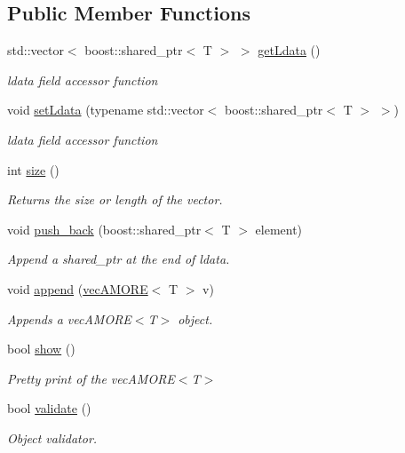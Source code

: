 \subsection*{Public Member Functions}
\begin{DoxyCompactItemize}
\item 
std::vector$<$ boost::shared\_\-ptr$<$ T $>$ $>$ \hyperlink{classvec_a_m_o_r_e_aeabf8a479f9031cc8ef9af0a971a08ea}{getLdata} ()
\begin{DoxyCompactList}\small\item\em ldata field accessor function \end{DoxyCompactList}\item 
void \hyperlink{classvec_a_m_o_r_e_ad1594c084d534c3de7acedd714f2e12a}{setLdata} (typename std::vector$<$ boost::shared\_\-ptr$<$ T $>$ $>$)
\begin{DoxyCompactList}\small\item\em ldata field accessor function \end{DoxyCompactList}\item 
int \hyperlink{classvec_a_m_o_r_e_ae1289a7870dbdd19b6455a890e94ce48}{size} ()
\begin{DoxyCompactList}\small\item\em Returns the size or length of the vector. \end{DoxyCompactList}\item 
void \hyperlink{classvec_a_m_o_r_e_a7b02ec757039b4d8fa98c3682002f156}{push\_\-back} (boost::shared\_\-ptr$<$ T $>$ element)
\begin{DoxyCompactList}\small\item\em Append a shared\_\-ptr at the end of ldata. \end{DoxyCompactList}\item 
void \hyperlink{classvec_a_m_o_r_e_ab060ffa67e85997fc4236bedfd2f17b6}{append} (\hyperlink{classvec_a_m_o_r_e}{vecAMORE}$<$ T $>$ v)
\begin{DoxyCompactList}\small\item\em Appends a vecAMORE$<$T$>$ object. \end{DoxyCompactList}\item 
bool \hyperlink{classvec_a_m_o_r_e_a11b0ffb0d2481f1960cb49a26b227d37}{show} ()
\begin{DoxyCompactList}\small\item\em Pretty print of the vecAMORE$<$T$>$ \end{DoxyCompactList}\item 
bool \hyperlink{classvec_a_m_o_r_e_a247aaafe9115cc433fc3be297c1f568e}{validate} ()
\begin{DoxyCompactList}\small\item\em Object validator. \end{DoxyCompactList}\end{DoxyCompactItemize}
